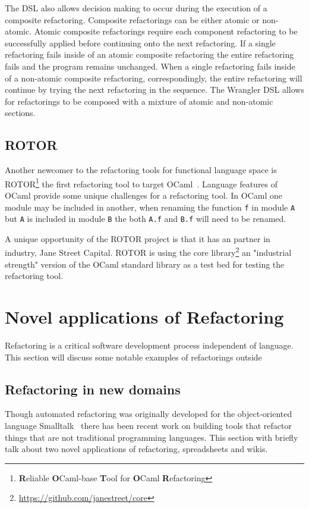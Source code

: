 The DSL also allows decision making to occur during the execution of a composite refactoring. Composite refactorings can be either atomic or non-atomic. Atomic composite refactorings require each component refactoring to be successfully applied before continuing onto the next refactoring. If a single refactoring fails inside of an atomic composite refactoring the entire refactoring fails and the program remains unchanged. When a single refactoring fails inside of a non-atomic composite refactoring, correspondingly, the entire refactoring will continue by trying the next refactoring in the sequence. The Wrangler DSL allows for refactorings to be composed with a mixture of atomic and non-atomic sections.  

\subsection{ROTOR}

Another newcomer to the refactoring tools for functional language space is ROTOR\footnote{\textbf{R}eliable \textbf{O}Caml-base \textbf{T}ool for \textbf{O}Caml \textbf{R}efactoring} the first refactoring tool to target OCaml~\citep{rotor}. Language features of OCaml provide some unique challenges for a refactoring tool. In OCaml one module may be included in another, when renaming the function \texttt{f} in module \texttt{A} but \texttt{A} is included in module \texttt{B} the both \texttt{A.f} and \texttt{B.f} will need to be renamed. 

A unique opportunity of the ROTOR project is that it has an partner in industry, Jane Street Capital. ROTOR is using the core library\footnote{\url{https://github.com/janestreet/core}} an "industrial strength" version of the OCaml standard library as a test bed for testing the refactoring tool.
 
\section{Novel applications of Refactoring}\label{otherTools}

Refactoring is a critical software development process independent of language. This section will discuss some notable examples of refactorings outside 

\subsection{Refactoring in new domains}
Though automated refactoring was originally developed for the object-oriented language Smalltalk~\citep{refactoringBrowser} there has been recent work on building tools that refactor things that are not traditional programming languages. This section with briefly talk about two novel applications of refactoring, spreadsheets and wikis.

